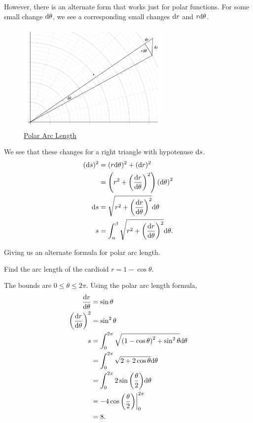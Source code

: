 However, there is an alternate form that works just for polar functions.
For some small change $\mathrm{d} \theta$, we see a corresponding small changes $\mathrm{d} r$ and $r\mathrm{d} \theta$.
\begin{figure}[H]
	\label{polar_arclength}
	\centering
	\includegraphics[width=0.66\textwidth]{./parametric_vector_polar/polar_length.png}
	\caption{\hyperref{}{}{}{Polar Arc Length}}
\end{figure}
We see that these changes for a right triangle with hypotenuse $\mathrm{d} s$.
\begin{align*}
	(\mathrm{d} s)^2 &= (r\mathrm{d} \theta)^2 + (\mathrm{d} r)^2 \\
	&= \left(r^2 + \left(\frac{\mathrm{d} r}{\mathrm{d} \theta}\right)^2\right)\left(\mathrm{d} \theta\right)^2 \\
	\mathrm{d} s &= \sqrt{r^2 + \left(\frac{\mathrm{d} r}{\mathrm{d} \theta}\right)^2}\mathrm{d} \theta \\
	s &= \int_{\alpha}^{\beta}{\sqrt{r^2 + \left(\frac{\mathrm{d} r}{\mathrm{d} \theta}\right)^2}\mathrm{d} \theta}.
\end{align*}

Giving us an alternate formula for polar arc length.

\begin{example}
	Find the arc length of the cardioid $r=1-\cos{\theta}$.
\end{example}
\begin{answer}
	The bounds are $0 \leq \theta \leq 2\pi$.
	Using the polar arc length formula,
	\begin{align*}
		\frac{\mathrm{d} r}{\mathrm{d} \theta} &= \sin{\theta} \\
		\left(\frac{\mathrm{d} r}{\mathrm{d} \theta}\right)^2 &= \sin^2{\theta} \\
		s &= \int_{0}^{2\pi}{\sqrt{\left(1-\cos{\theta}\right)^2+\sin^2{\theta}}\mathrm{d} \theta} \\
		&= \int_{0}^{2\pi}{\sqrt{2+2\cos{\theta}}\mathrm{d} \theta} \\
		&= \int_{0}^{2\pi}{2\sin{\left(\frac{\theta}{2}\right)}\mathrm{d} \theta} \\
		&= -4\cos{\left(\frac{\theta}{2}\right)}\biggr\rvert_{0}^{2\pi} \\
		&= 8.
	\end{align*}
\end{answer}
